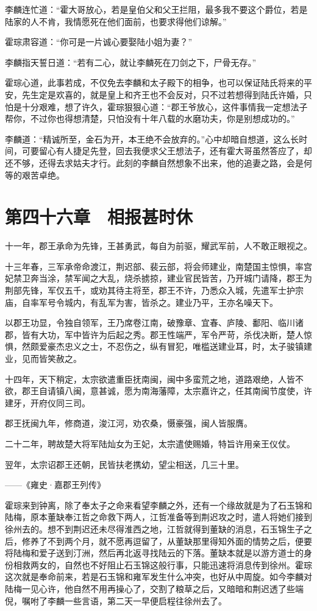 李麟连忙道：“霍大哥放心，若是皇伯父和父王拦阻，最多我不要这个爵位，若是陆家的人不肯，我情愿死在他们面前，也要求得他们谅解。”

霍琮肃容道：“你可是一片诚心要娶陆小姐为妻？”

李麟指天誓日道：“若有二心，就让李麟死在刀剑之下，尸骨无存。”

霍琮心道，此事若成，不仅免去李麟和太子殿下的相争，也可以保证陆氏将来的平安，先生定是欢喜的，就是皇上和齐王也不会反对，只不过若想得到陆氏许婚，只怕是十分艰难，想了许久，霍琮狠狠心道：“郡王爷放心，这件事情我一定想法子帮你，不过你也得想清楚，只怕没有十年八载的水磨功夫，你是别想成功的。”

李麟道：“精诚所至，金石为开，本王绝不会放弃的。”心中却暗自想道，这么长时间，可要留心有人捷足先登，回去我便求父王想法子，还有霍大哥虽然答应了，却还不够，还得去求姑夫才行。此刻的李麟自然想象不出来，他的追妻之路，会是何等的艰苦卓绝。

\chapter{第四十六章　相报甚时休}

十一年，郡王承命为先锋，王甚勇武，每自为前驱，耀武军前，人不敢正眼视之。

十三年春，三军承帝命渡江，荆迟部、裴云部，将会师建业，南楚国主惊惧，率宫妃禁卫奔当涂，禁军闻之大乱，烧杀掳掠，建业官民皆苦，乃开城门请降，郡王为荆部先锋，军仅五千，或劝其待主将至，郡王不许，乃悉众入城，先遣军士护宗庙，自率军号令城内，有乱军为害，皆杀之。建业乃平，王亦名噪天下。

以郡王功显，令独自领军，王乃席卷江南，破豫章、宜春、庐陵、鄱阳、临川诸郡，皆有大功，军中皆许为后起之秀。郡王性端严，军令严苛，杀伐决断，楚人惊惧，然颇爱豪杰忠义之士，不忍伤之，纵有冒犯，唯槛送建业耳，时，太子骏镇建业，见而皆笑赦之。

十四年，天下稍定，太宗欲遣重臣抚南闽，闽中多蛮荒之地，道路艰绝，人皆不欲，郡王自请镇八闽，意甚诚，愿为南海藩障，太宗嘉许之，任其南闽节度使，许建牙，开府仪同三司。

郡王抚闽九年，修商道，浚江河，劝农桑，慑豪强，闽人皆服膺。

二十二年，聘故楚大将军陆灿女为王妃，太宗遣使赐婚，特旨许用亲王仪仗。

翌年，太宗诏郡王还朝，民皆扶老携幼，望尘相送，几三十里。

——《雍史·嘉郡王列传》

霍琮来到钟离，除了奉太子之命来看望李麟之外，还有一个缘故就是为了石玉锦和陆梅，原本董缺奉江哲之命救下两人，江哲准备等到荆迟攻之时，遣人将她们接到徐州去的。想不到荆迟还未尽得淮西之地，江哲就得到董缺的消息，石玉锦生子之后，修养了不到两个月，就不愿再逗留了，从董缺那里得知外面的情势之后，便要将陆梅和爱子送到汀洲，然后再北返寻找陆云的下落。董缺本就是以游方道士的身份相救两女的，自然也不好阻止石玉锦这般行事，只能迅速将消息传到徐州。霍琮这次就是奉命前来，若是石玉锦和雍军发生什么冲突，也好从中周旋。如今李麟对陆梅一见心许，他自然不用再操心了，交割了粮草之后，又暗暗和荆迟透了些端倪，嘱咐了李麟一些言语，第二天一早便启程往徐州去了。

